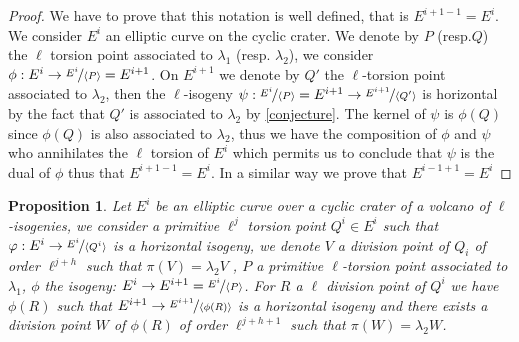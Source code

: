 \documentclass{article}
\theoremstyle{plain}
\newtheorem{prop}[thm]{Proposition}
\theoremstyle{definition}
\theoremstyle{remark}
\begin{document}
\begin{proof}
We have to prove that this notation is well defined, that is $E^{i+1-1}=E^{i}$. We consider $E^i$ an elliptic curve on the cyclic crater. We denote by $P$ (resp.$Q$) the $\ell$ torsion point associated to $\lambda_1$ (resp. $\lambda_2$), we consider $\phi: E^i\rightarrow \nicefrac{E^i}{\langle P \rangle}=E^{i+1}$. On $E^{i+1}$ we denote by $Q'$ the $\ell$-torsion point associated to $\lambda_2$, then the $\ell$-isogeny $\psi: \nicefrac{E^i}{\langle P \rangle}=E^{i+1}\rightarrow \nicefrac{E^{i+1}}{\langle Q' \rangle}$ is horizontal by the fact that $Q'$ is associated to $\lambda_2$ by \ref{conjecture}. The kernel of $\psi$ is $\phi(Q)$ since $\phi(Q)$ is also associated to $\lambda_2$, thus we have the composition of $\phi$ and $\psi$ who annihilates the $\ell$ torsion of $E^i$ which permits us to conclude that $\psi$ is the dual of $\phi$ thus that $E^{i+1-1}=E^{i}$. In a similar way we prove that $E^{i-1+1}=E^{i}$
\end{proof}

\begin{prop}\label{propcentrale}
Let $E^i$ be an elliptic curve over a cyclic crater of a volcano of $\ell$-isogenies, we consider a primitive $\ell^j$ torsion point $Q^i \in E^i$ such that $\varphi: E^i \rightarrow \nicefrac{E^i}{\langle Q^i \rangle }$ is a horizontal isogeny, we denote $V$ a division point of $Q_i$ of order $\ell^{j+h}$ such that $\pi(V)=\lambda_2V$  , $P$ a primitive $\ell$-torsion point associated to $\lambda_1$, $\phi$ the isogeny: $E^{i}\rightarrow E^{i+1}=\nicefrac{E^i}{\langle P \rangle}$. For $R$ a $\ell$ division point of $Q^i$ we have $\phi(R)$ such that $E^{i+1} \rightarrow \nicefrac{E^{i+1}}{\langle \phi(R) \rangle}$ is a horizontal isogeny and there exists a division point $W$ of $\phi(R)$ of order $\ell^{j+h+1}$ such that $\pi(W)=\lambda_2W$.  
\end{prop}
\end{document}
